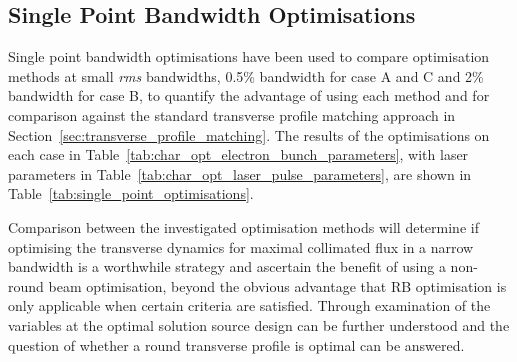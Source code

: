 \documentclass[../main.tex]{subfiles}
\begin{document}
\subsection{Single Point Bandwidth Optimisations}

Single point bandwidth optimisations have been used to compare optimisation methods at small \textit{rms} bandwidths, 0.5\%  bandwidth for case A and C and 2\%  bandwidth for case B, to quantify the advantage of using each method and for comparison against the standard transverse profile matching approach in Section~\ref{sec:transverse_profile_matching}. The results of the optimisations on each case in Table~\ref{tab:char_opt_electron_bunch_parameters}, with laser parameters in Table~\ref{tab:char_opt_laser_pulse_parameters}, are shown in Table~\ref{tab:single_point_optimisations}. 

Comparison between the investigated optimisation methods will determine if optimising the transverse dynamics for maximal collimated flux in a narrow bandwidth is a worthwhile strategy and ascertain the benefit of using a non-round beam optimisation, beyond the obvious advantage that RB optimisation is only applicable when certain criteria are satisfied. Through examination of the variables at the optimal solution source design can be further understood and the question of whether a round transverse profile is optimal can be answered.      
\end{document}
